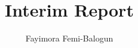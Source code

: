 \documentclass[a4paper,12pt,twoside]{report}
\begin{document}
\title{\LARGE {\bf Interim Report}\\
 \vspace*{6mm}
}

\author{Fayimora Femi-Balogun}
\normallinespacing
\maketitle

\preface

%
%
%

\body



% 


%



%
%
\end{document}
